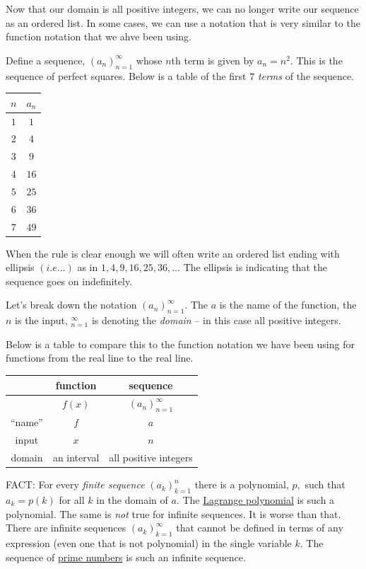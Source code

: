 Now that our domain is all positive integers, we can no longer write our sequence as an ordered list. In some cases, we can use a notation that is very similar to the function notation that we ahve been using.
\begin{example}
    Define a sequence, \(\left(a_n\right)_{n=1}^{\infty}\) whose \(n\)th term is given by \(a_n=n^2.\) This is the sequence of perfect squares. Below is a table of the first \(7\) \emph{terms} of the sequence.
    
     \begin{tabular}{c|c}
         \(n\)& \(a_n\)  \\ \hline
         \(1\) & \(1\) \\
         \(2\) & \(4\) \\
         \(3\) & \(9\) \\
         \(4\) & \(16\) \\
         \(5\) & \(25\) \\
         \(6\) & \(36\) \\
         \(7\) & \(49\)
    \end{tabular}

    When the rule is clear enough we will often write an ordered list ending with ellipsis \(\left(i.e \dots\right)\) as in \(1,4,9,16,25,36,\dots\) The ellipsis is indicating that the sequence goes on indefinitely.
\end{example}

Let's break down the notation \(\left(a_n\right)_{n=1}^{\infty}.\) The \(a\) is the name of the function, the \(n\) is the input, \(_{n=1}^{\infty}\) is denoting the \emph{domain} -- in this case all positive integers. 

Below is a table to compare this to the function notation we have been using for functions from the real line to the real line.

\begin{tabular}{c|c|c}
    &function & sequence  \\ \hline
     &\(f\left(x\right)\) & \(\left(a_n\right)_{n=1}^{\infty}\)\\ 
     ``name'' & \(f\) & \(a\) \\
     input & \(x\) & \(n\) \\
     domain & an interval & all positive integers
\end{tabular}

FACT: For every \emph{finite sequence} \(\left(a_k\right)_{k=1}^n\) there is a polynomial, \(p,\) such that \(a_k = p\left(k\right)\) for all \(k\) in the domain of \(a.\) The \href{https://en.wikipedia.org/wiki/Lagrange_polynomial}{Lagrange polynomial} is such a polynomial. The same is \emph{not} true for infinite sequences. It is worse than that. There are infinite sequences \(\left(a_k\right)_{k=1}^{\infty}\) that cannot be defined in terms of any expression (even one that is not polynomial) in the single variable \(k.\) The sequence of \href{https://oeis.org/A000040}{prime numbers} is such an infinite sequence.

